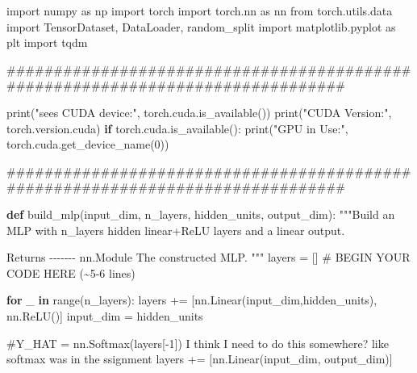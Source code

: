 \documentclass[
  letterpaper,
  DIV=11,
  numbers=noendperiod]{scrartcl}
\newenvironment{Shaded}{\begin{snugshade}}{\end{snugshade}}
\newcommand{\BuiltInTok}[1]{\textcolor[rgb]{0.00,0.23,0.31}{#1}}
\newcommand{\CommentTok}[1]{\textcolor[rgb]{0.37,0.37,0.37}{#1}}
\newcommand{\ControlFlowTok}[1]{\textcolor[rgb]{0.00,0.23,0.31}{\textbf{#1}}}
\newcommand{\DecValTok}[1]{\textcolor[rgb]{0.68,0.00,0.00}{#1}}
\newcommand{\ImportTok}[1]{\textcolor[rgb]{0.00,0.46,0.62}{#1}}
\newcommand{\KeywordTok}[1]{\textcolor[rgb]{0.00,0.23,0.31}{\textbf{#1}}}
\newcommand{\NormalTok}[1]{\textcolor[rgb]{0.00,0.23,0.31}{#1}}
\newcommand{\OperatorTok}[1]{\textcolor[rgb]{0.37,0.37,0.37}{#1}}
\newcommand{\RegionMarkerTok}[1]{\textcolor[rgb]{0.00,0.23,0.31}{#1}}
\newcommand{\StringTok}[1]{\textcolor[rgb]{0.13,0.47,0.30}{#1}}
\begin{document}
\begin{Shaded}
\begin{Highlighting}[]
\ImportTok{import}\NormalTok{ numpy }\ImportTok{as}\NormalTok{ np}
\ImportTok{import}\NormalTok{ torch}
\ImportTok{import}\NormalTok{ torch.nn }\ImportTok{as}\NormalTok{ nn}
\ImportTok{from}\NormalTok{ torch.utils.data }\ImportTok{import}\NormalTok{ TensorDataset, DataLoader, random\_split}
\ImportTok{import}\NormalTok{ matplotlib.pyplot }\ImportTok{as}\NormalTok{ plt}
\ImportTok{import}\NormalTok{ tqdm}


\CommentTok{\#\#\#\#\#\#\#\#\#\#\#\#\#\#\#\#\#\#\#\#\#\#\#\#\#\#\#\#\#\#\#\#\#\#\#\#\#\#\#\#\#\#\#\#\#\#\#\#\#\#\#\#\#\#\#\#\#\#\#\#\#\#\#\#\#\#\#\#\#\#\#\#\#\#\#\#\#\#\#}

\BuiltInTok{print}\NormalTok{(}\StringTok{"sees CUDA device:"}\NormalTok{, torch.cuda.is\_available())}
\BuiltInTok{print}\NormalTok{(}\StringTok{"CUDA Version:"}\NormalTok{, torch.version.cuda)}
\ControlFlowTok{if}\NormalTok{ torch.cuda.is\_available():}
    \BuiltInTok{print}\NormalTok{(}\StringTok{"GPU in Use:"}\NormalTok{, torch.cuda.get\_device\_name(}\DecValTok{0}\NormalTok{))}

\CommentTok{\#\#\#\#\#\#\#\#\#\#\#\#\#\#\#\#\#\#\#\#\#\#\#\#\#\#\#\#\#\#\#\#\#\#\#\#\#\#\#\#\#\#\#\#\#\#\#\#\#\#\#\#\#\#\#\#\#\#\#\#\#\#\#\#\#\#\#\#\#\#\#\#\#\#\#\#\#\#\#}

\KeywordTok{def}\NormalTok{ build\_mlp(input\_dim, n\_layers, hidden\_units, output\_dim):}
    \CommentTok{"""Build an MLP with \textasciigrave{}n\_layers\textasciigrave{} hidden linear+ReLU layers and a linear output.}

\CommentTok{    Returns}
\CommentTok{    {-}{-}{-}{-}{-}{-}{-}}
\CommentTok{    nn.Module}
\CommentTok{        The constructed MLP.}
\CommentTok{    """}
\NormalTok{    layers }\OperatorTok{=}\NormalTok{ []}
    \CommentTok{\# }\RegionMarkerTok{BEGIN}\CommentTok{ YOUR CODE HERE (\textasciitilde{}5{-}6 lines)}

    \ControlFlowTok{for}\NormalTok{ \_ }\KeywordTok{in} \BuiltInTok{range}\NormalTok{(n\_layers):}
\NormalTok{        layers }\OperatorTok{+=}\NormalTok{ [nn.Linear(input\_dim,hidden\_units), nn.ReLU()]}
\NormalTok{        input\_dim }\OperatorTok{=}\NormalTok{ hidden\_units}

    \CommentTok{\#Y\_HAT = nn.Softmax(layers[{-}1]) I think I need to do this somewhere?  like softmax was in the ssignment}
\NormalTok{    layers }\OperatorTok{+=}\NormalTok{ [nn.Linear(input\_dim, output\_dim)]}



\end{Highlighting}
\end{Shaded}
\end{document}
